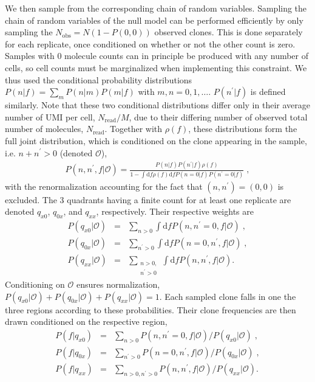 We then sample from the corresponding chain of random variables.
Sampling the chain of random variables of the null model can be performed efficiently by only sampling the $N_{\textrm{obs}}=N(1-P(0,0))$ observed clones. This is done separately for each replicate, once conditioned on whether or not the other count is zero. 
Samples with 0 molecule counts can in principle be produced with any number of cells, so cell counts must be marginalized when implementing this constraint. We thus used the conditional probability distributions $P(n|f)=\sum_{m}P(n|m)P(m|f)$ with $m,n=0,1,\dots$. $P(n^\prime|f)$ is defined similarly. Note that these two conditional distributions differ only in their average number of UMI per cell, $N_{\textrm{read}}/M$, due to their differing number of observed total number of molecules, $N_{\textrm{read}}$. Together with $\rho(f)$, these distributions form the full joint distribution, which is conditioned on the clone appearing in the sample, i.e. $n+n^{\prime}>0$ (denoted $\mathcal{O}$), 
\begin{align}
	P(n,n^{\prime},f|\mathcal{O})= \frac{P(n|f)P(n^{\prime}|f)\rho(f)}{1-\int{\textrm{d}f \rho(f)\textrm{d}f P(n=0|f)P(n^{\prime}=0|f)}}\;,  
\end{align}
with the renormalization accounting for the fact that $(n,n^{\prime})=(0,0)$ is excluded. The 3 quadrants having a finite count for at least one replicate are denoted $q_{x0}$, $q_{0x}$, and $q_{xx}$, respectively. Their respective weights are
\begin{align}
	P(q_{x0}|\mathcal{O})&=&\sum_{n>0}\int{\textrm{d}f P(n,n^{\prime}=0,f|\mathcal{O})}\;,\\
	P(q_{0x}|\mathcal{O})&=&\sum_{n^{\prime}>0}\int{\textrm{d}f P(n=0,n^{\prime},f|\mathcal{O})}\;,\\
	P(q_{xx}|\mathcal{O})&=&\sum_{\substack{n>0,\\n^{\prime}>0}}\int{\textrm{d}f P(n,n^{\prime},f|\mathcal{O})}.
\end{align}
Conditioning on $\mathcal{O}$ ensures normalization, $P(q_{x0}|\mathcal{O})+P(q_{0x}|\mathcal{O})+P(q_{xx}|\mathcal{O})=1$. Each sampled clone falls in one the three regions according to these probabilities. Their clone frequencies are then drawn conditioned on the respective region, 
\begin{align}
	P(f|q_{x0})&=&\sum_{n>0}P(n,n^{\prime}=0,f|\mathcal{O})/P(q_{x0}|\mathcal{O})\;,\\
	P(f|q_{0x})&=&\sum_{n^{\prime}>0}P(n=0,n^{\prime},f|\mathcal{O})/P(q_{0x}|\mathcal{O})\;,\\
	P(f|q_{xx})&=&\sum_{{n>0,n^{\prime}>0}}P(n,n^{\prime},f|\mathcal{O})/P(q_{xx}|\mathcal{O}).
\end{align}

